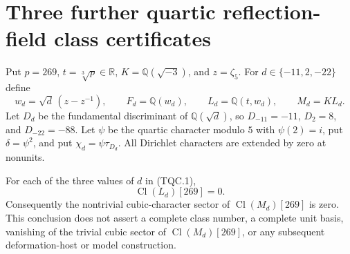 \section{Three further quartic reflection-field class certificates}
\label{sec:cubic-three-quartic-class-certificates}

Put $p=269$, $t=\sqrt[3]{p}\in\mathbb R$, $K=\mathbb Q(\sqrt{-3})$,
and $z=\zeta_5$.  For $d\in\{-11,2,-22\}$ define
\[
 w_d=\sqrt d\,(z-z^{-1}),\qquad F_d=\mathbb Q(w_d),\qquad
 L_d=\mathbb Q(t,w_d),\qquad M_d=KL_d.
 \tag{TQC.1}
\]
Let $D_d$ be the fundamental discriminant of $\mathbb Q(\sqrt d)$,
so $D_{-11}=-11$, $D_2=8$, and $D_{-22}=-88$.
Let $\psi$ be the quartic character modulo $5$ with $\psi(2)=i$,
put $\delta=\psi^2$, and put $\chi_d=\psi\tau_{D_d}$.
All Dirichlet characters are extended by zero at nonunits.

\begin{theorem}
\label{AC-G135-quartic-classes}
For each of the three values of $d$ in (TQC.1),
\[
       \operatorname{Cl}(L_d)[269]=0.
 \tag{TQC.2}
\]
Consequently the nontrivial cubic-character sector of
$\operatorname{Cl}(M_d)[269]$ is zero.  This conclusion does not
assert a complete class number, a complete unit basis, vanishing
of the trivial cubic sector of $\operatorname{Cl}(M_d)[269]$,
or any subsequent deformation-host or model construction.
\end{theorem}

